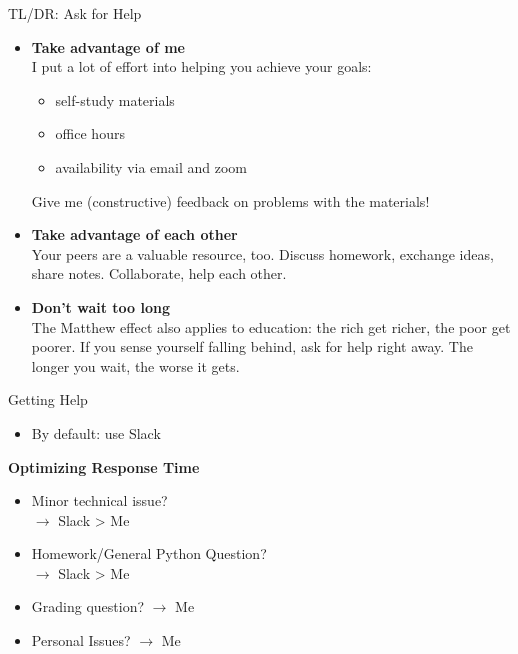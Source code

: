 \documentclass[professionalfonts, xcolor={usenames,svgnames,x11names,table}]{beamer}
\begin{document}
\begin{frame}{TL/DR: Ask for Help}
    \begin{itemize}
        \item \textbf{Take advantage of me}\\
            I put a lot of effort into helping you achieve your goals:
            \begin{itemize}
            	\item self-study materials
                \item office hours
                \item availability via email and zoom
            \end{itemize}
            Give me (constructive) feedback on problems with the materials!
            
        \item \textbf{Take advantage of each other}\\
            Your peers are a valuable resource, too.
            Discuss homework, exchange ideas, share notes.
            Collaborate, help each other.

        \item \textbf{Don't wait too long}\\
            The Matthew effect also applies to education: the rich get richer, the poor get poorer.
            If you sense yourself falling behind, ask for help right away.
            The longer you wait, the worse it gets.
    \end{itemize}
\end{frame}

\begin{frame}{Getting Help}
    \begin{itemize}
        \item By default: use Slack
\end{itemize}

 \textbf{Optimizing Response Time}
  \begin{itemize}
        \item Minor technical issue? \\ $\rightarrow$ Slack > Me
         \item Homework/General Python Question?  \\ $\rightarrow$   Slack  > Me
         \item Grading question? $\rightarrow$  Me
         \item Personal Issues?  $\rightarrow$ Me
    \end{itemize}
    \end{frame}
             
\end{document}
